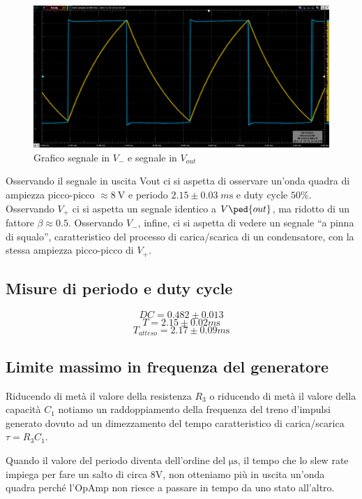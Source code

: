 \documentclass[10pt,a4paper]{article}
\begin{document}
\begin{figure}[htbp]
\centering
\includegraphics[scale=0.4]{V-Vout}
\caption{Grafico segnale in $V_-$ e segnale in $V_{out}$}
\end{figure}

Osservando il segnale in uscita Vout ci si aspetta di osservare un’onda quadra
di ampiezza picco-picco $\approx \SI{8}{\V}$ e periodo $2.15 \pm 0.03 \; \si{m\s}$ e
duty cycle $50 \%$.
Osservando $V_+$ ci si aspetta un segnale identico a $V\ped{out}$, ma ridotto di
un fattore $\beta \approx 0.5$.
Osservando $V_-$, infine, ci si aspetta di vedere un segnale ``a pinna di
squalo'', caratteristico del processo di carica/scarica di un condensatore,
con la stessa ampiezza picco-picco di $V_+$.

\subsection{Misure di periodo e duty cycle}

\[
DC = 0.482 \pm 0.013
\]
\[
T = 2.15 \pm 0.02 \si{m\s}
\]
\[
T_{atteso} = 2.17 \pm 0.09 \si{m\s}
\]

\subsection{Limite massimo in frequenza del generatore}
Riducendo di metà il valore della resistenza $R_3$ o riducendo di metà il
valore della capacità $C_1$ notiamo un raddoppiamento della frequenza
del treno d'impulsi generato dovuto ad un dimezzamento del tempo
caratteristico di carica/scarica $\tau=R_3 C_1$.

Quando il valore del periodo diventa dell'ordine del $\si{\micro\s}$, il
tempo che lo slew rate impiega per fare un salto di circa $8$V, non
otteniamo più in uscita un'onda quadra perché l'OpAmp non riesce a passare
in tempo da uno stato all'altro.
\end{document}
